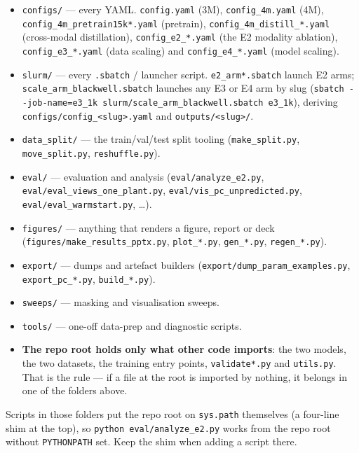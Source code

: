 \documentclass[
  10pt,
]{article}
\providecommand{\tightlist}{%
  \setlength{\itemsep}{0pt}\setlength{\parskip}{0pt}}
\begin{document}
\begin{itemize}
\tightlist
\item
  \texttt{configs/} --- every YAML. \texttt{config.yaml} (3M),
  \texttt{config\_4m.yaml} (4M), \texttt{config\_4m\_pretrain15k*.yaml}
  (pretrain), \texttt{config\_4m\_distill\_*.yaml} (cross-modal
  distillation), \texttt{config\_e2\_*.yaml} (the E2 modality ablation),
  \texttt{config\_e3\_*.yaml} (data scaling) and
  \texttt{config\_e4\_*.yaml} (model scaling).
\item
  \texttt{slurm/} --- every \texttt{.sbatch} / launcher script.
  \texttt{e2\_arm*.sbatch} launch E2 arms;
  \texttt{scale\_arm\_blackwell.sbatch} launches any E3 or E4 arm by
  slug
  (\texttt{sbatch\ -\/-job-name=e3\_1k\ slurm/scale\_arm\_blackwell.sbatch\ e3\_1k}),
  deriving \texttt{configs/config\_\textless{}slug\textgreater{}.yaml}
  and \texttt{outputs/\textless{}slug\textgreater{}/}.
\item
  \texttt{data\_split/} --- the train/val/test split tooling
  (\texttt{make\_split.py}, \texttt{move\_split.py},
  \texttt{reshuffle.py}).
\item
  \texttt{eval/} --- evaluation and analysis
  (\texttt{eval/analyze\_e2.py},
  \texttt{eval/eval\_views\_one\_plant.py},
  \texttt{eval/vis\_pc\_unpredicted.py},
  \texttt{eval/eval\_warmstart.py}, \ldots).
\item
  \texttt{figures/} --- anything that renders a figure, report or deck
  (\texttt{figures/make\_results\_pptx.py}, \texttt{plot\_*.py},
  \texttt{gen\_*.py}, \texttt{regen\_*.py}).
\item
  \texttt{export/} --- dumps and artefact builders
  (\texttt{export/dump\_param\_examples.py}, \texttt{export\_pc\_*.py},
  \texttt{build\_*.py}).
\item
  \texttt{sweeps/} --- masking and visualisation sweeps.
\item
  \texttt{tools/} --- one-off data-prep and diagnostic scripts.
\item
  \textbf{The repo root holds only what other code imports}: the two
  models, the two datasets, the training entry points,
  \texttt{validate*.py} and \texttt{utils.py}. That is the rule --- if a
  file at the root is imported by nothing, it belongs in one of the
  folders above.
\end{itemize}

Scripts in those folders put the repo root on \texttt{sys.path}
themselves (a four-line shim at the top), so
\texttt{python\ eval/analyze\_e2.py} works from the repo root without
\texttt{PYTHONPATH} set. Keep the shim when adding a script there.
\end{document}
